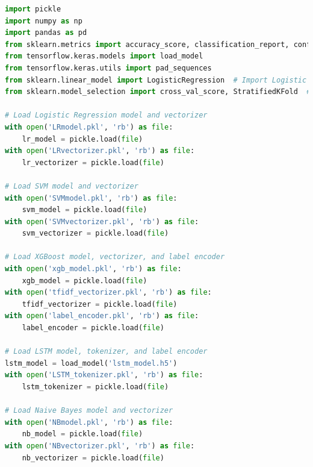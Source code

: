 \begin{tcolorbox}[colback=gray!5!white, colframe=gray!80!black, boxrule=0.5pt, title=Evaluate Meta-Learner and Ensemble Model 3]
    \begin{lstlisting}[language=Python]
import pickle
import numpy as np
import pandas as pd
from sklearn.metrics import accuracy_score, classification_report, confusion_matrix
from tensorflow.keras.models import load_model
from tensorflow.keras.utils import pad_sequences
from sklearn.linear_model import LogisticRegression  # Import Logistic Regression
from sklearn.model_selection import cross_val_score, StratifiedKFold  # For cross-validation

# Load Logistic Regression model and vectorizer
with open('LRmodel.pkl', 'rb') as file:
    lr_model = pickle.load(file)
with open('LRvectorizer.pkl', 'rb') as file:
    lr_vectorizer = pickle.load(file)

# Load SVM model and vectorizer
with open('SVMmodel.pkl', 'rb') as file:
    svm_model = pickle.load(file)
with open('SVMvectorizer.pkl', 'rb') as file:
    svm_vectorizer = pickle.load(file)

# Load XGBoost model, vectorizer, and label encoder
with open('xgb_model.pkl', 'rb') as file:
    xgb_model = pickle.load(file)
with open('tfidf_vectorizer.pkl', 'rb') as file:
    tfidf_vectorizer = pickle.load(file)
with open('label_encoder.pkl', 'rb') as file:
    label_encoder = pickle.load(file)

# Load LSTM model, tokenizer, and label encoder
lstm_model = load_model('lstm_model.h5')
with open('LSTM_tokenizer.pkl', 'rb') as file:
    lstm_tokenizer = pickle.load(file)

# Load Naive Bayes model and vectorizer
with open('NBmodel.pkl', 'rb') as file:
    nb_model = pickle.load(file)
with open('NBvectorizer.pkl', 'rb') as file:
    nb_vectorizer = pickle.load(file)
\end{lstlisting}
\end{tcolorbox}

